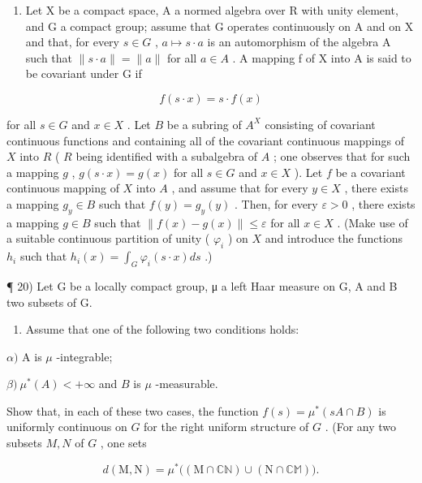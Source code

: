 \begin{enumerate}
\def\labelenumi{\arabic{enumi})}
\setcounter{enumi}{18}
\tightlist
\item
  Let X be a compact space, A a normed algebra over R with unity element, and G a compact group; assume that G operates continuously on A and on X and that, for every \(s \in G\) , \(a \mapsto s \cdot a\) is an automorphism of the algebra A such that \(\|s \cdot a\| = \|a\|\) for all \(a \in A\) . A mapping f of X into A is said to be covariant under G if
\end{enumerate}

\[
f (s \cdot x) = s \cdot f (x)
\]

for all \(s \in G\) and \(x \in X\) . Let \(B\) be a subring of \(A^X\) consisting of covariant continuous functions and containing all of the covariant continuous mappings of \(X\) into \(R\) ( \(R\) being identified with a subalgebra of \(A\) ; one observes that for such a mapping \(g\) , \(g(s \cdot x) = g(x)\) for all \(s \in G\) and \(x \in X\) ). Let \(f\) be a covariant continuous mapping of \(X\) into \(A\) , and assume that for every \(y \in X\) , there exists a mapping \(g_y \in B\) such that \(f(y) = g_y(y)\) . Then, for every \(\varepsilon > 0\) , there exists a mapping \(g \in B\) such that \(\|f(x) - g(x)\| \leqslant \varepsilon\) for all \(x \in X\) . (Make use of a suitable continuous partition of unity ( \(\varphi_i\) ) on \(X\) and introduce the functions \(h_i\) such that \(h_i(x) = \int_G \varphi_i(s \cdot x) ds\) .)

¶ 20) Let G be a locally compact group, μ a left Haar measure on G, A and B two subsets of G.

\begin{enumerate}
\def\labelenumi{\alph{enumi})}
\tightlist
\item
  Assume that one of the following two conditions holds:
\end{enumerate}

\(\alpha)\) A is \(\mu\) -integrable;

\(\beta)\ \mu^{*}(A) < +\infty\) and \(B\) is \(\mu\) -measurable.

Show that, in each of these two cases, the function \(f(s) = \mu^{*}(sA \cap B)\) is uniformly continuous on \(G\) for the right uniform structure of \(G\) . (For any two subsets \(M, N\) of \(G\) , one sets

\[
d (\mathrm{M}, \mathrm{N}) = \mu^ {*} \big ((\mathrm{M} \cap \mathbb {C N}) \cup (\mathrm{N} \cap \mathbb {C M}) \big).
\]

